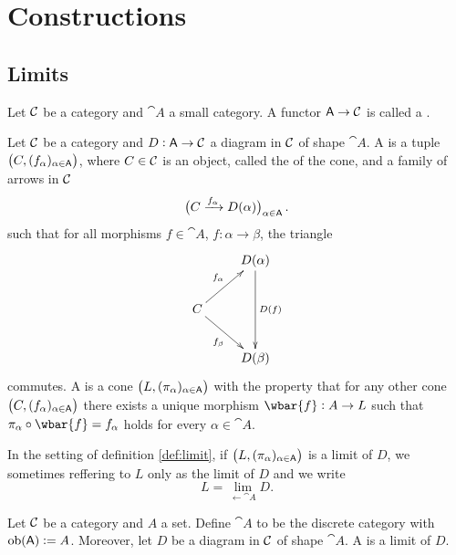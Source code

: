\chapter{Constructions}
\section{Limits}

\begin{definition}[Diagram]
	Let $\mathcal{C}$ be a category and $\cat{A}$ a small category. A functor $\mathsf{A} \to \mathcal{C}$ is called a .
\end{definition}

\begin{definition}
	Let $\mathcal{C}$ be a category and $D : \mathsf{A} \to \mathcal{C}$ a diagram in $\mathcal{C}$ of shape $\cat{A}$. A  is a tuple $\del[1]{C,(f_\alpha)_{\alpha \in \cat{A}}}$, where $C \in \mathcal{C}$ is an object, called the  of the cone, and a family of arrows in $\mathcal{C}$
	\begin{equation}
		\del[1]{C \xrightarrow{f_\alpha} D(\alpha)}_{\alpha \in \cat{A}}.
	\end{equation}
	\noindent such that for all morphisms $f \in \cat{A}$, $f : \alpha \to \beta$, the triangle
	\begin{equation*}
		\xymatrix{
			& D(\alpha) \ar[dd]^{D(f)}\\
			C \ar[ur]^{f_\alpha}\ar[dr]_{f_\beta}\\
			& D(\beta)}
	\end{equation*}
	\noindent commutes. A  is a cone $\del[1]{L, (\pi_\alpha)_{\alpha \in \cat{A}}}$ with the property that for any other cone $\del[1]{C,(f_\alpha)_{\alpha \in \cat{A}}}$ there exists a unique morphism $\wbar{f} : A \to L$ such that $\pi_\alpha \circ \wbar{f} = f_\alpha$ holds for every $\alpha \in \cat{A}$.
	\label{def:limit}
\end{definition}

\begin{remark}
	In the setting of definition \ref{def:limit}, if $\del[1]{L, (\pi_\alpha)_{\alpha \in \cat{A}}}$ is a limit of $D$, we sometimes reffering to $L$ only as the limit of $D$ and we write
	\begin{equation}
		L = \lim_{\leftarrow \cat{A}} D.
	\end{equation}
\end{remark}

\begin{definition}[Product]
	Let $\mathcal{C}$ be a category and $A$ a set. Define $\cat{A}$ to be the discrete category with $\operatorname{ob}(\mathsf{A}) := A$. Moreover, let $D$ be a diagram in $\mathcal{C}$ of shape $\cat{A}$. A  is a limit of $D$. 
	\label{def:product}
\end{definition}

